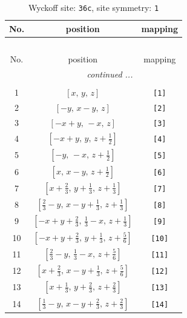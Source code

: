 \documentclass[fleqn,8pt]{jsarticle}
\begin{document}
\renewcommand{\arraystretch}{1.2}
\begin{longtable}{ccc}
\caption{Wyckoff site: {\tt 36c}, site symmetry: {\tt 1}}
 \\
 \hline \hline
No. & position & mapping \\ \hline \endfirsthead

\multicolumn{2}{l}{\tablename\ \thetable{}} \\
 \hline \hline
No. & position & mapping \\ \hline \endhead

 \hline \hline
\multicolumn{2}{r}{\footnotesize\it continued ...} \\ \endfoot

 \hline \hline
\multicolumn{2}{r}{} \\ \endlastfoot

1 & $\left[ x,\, y,\, z \right]$ & {\tt [1]} \\ \hline
2 & $\left[ - y,\, x - y,\, z \right]$ & {\tt [2]} \\ \hline
3 & $\left[ - x + y,\, - x,\, z \right]$ & {\tt [3]} \\ \hline
4 & $\left[ - x + y,\, y,\, z + \frac{1}{2} \right]$ & {\tt [4]} \\ \hline
5 & $\left[ - y,\, - x,\, z + \frac{1}{2} \right]$ & {\tt [5]} \\ \hline
6 & $\left[ x,\, x - y,\, z + \frac{1}{2} \right]$ & {\tt [6]} \\ \hline
7 & $\left[ x + \frac{2}{3},\, y + \frac{1}{3},\, z + \frac{1}{3} \right]$ & {\tt [7]} \\ \hline
8 & $\left[ \frac{2}{3} - y,\, x - y + \frac{1}{3},\, z + \frac{1}{3} \right]$ & {\tt [8]} \\ \hline
9 & $\left[ - x + y + \frac{2}{3},\, \frac{1}{3} - x,\, z + \frac{1}{3} \right]$ & {\tt [9]} \\ \hline
10 & $\left[ - x + y + \frac{2}{3},\, y + \frac{1}{3},\, z + \frac{5}{6} \right]$ & {\tt [10]} \\ \hline
11 & $\left[ \frac{2}{3} - y,\, \frac{1}{3} - x,\, z + \frac{5}{6} \right]$ & {\tt [11]} \\ \hline
12 & $\left[ x + \frac{2}{3},\, x - y + \frac{1}{3},\, z + \frac{5}{6} \right]$ & {\tt [12]} \\ \hline
13 & $\left[ x + \frac{1}{3},\, y + \frac{2}{3},\, z + \frac{2}{3} \right]$ & {\tt [13]} \\ \hline
14 & $\left[ \frac{1}{3} - y,\, x - y + \frac{2}{3},\, z + \frac{2}{3} \right]$ & {\tt [14]} \\ \hline

\end{longtable}
\end{document}
